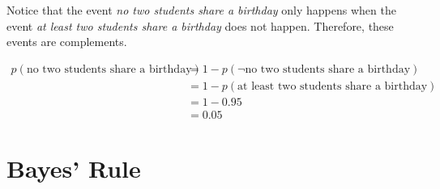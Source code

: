\documentclass[assignment01_Solutions]{subfiles}
\begin{document}
\begin{exercise}[(10 minutes)]
\begin{boxedsolution}
Notice that the event \emph{no two students share a birthday} only happens when the event \emph{at least two students share a birthday} does not happen.  Therefore, these events are complements.

\begin{align}
p(\mbox{no two students share a birthday}) &= 1 - p( \neg \mbox{no two students share a birthday})  \nonumber\\
&= 1 - p(\mbox{at least two students share a birthday}) \nonumber \\
&= 1 - 0.95  \nonumber\\
&= 0.05  \nonumber
\end{align}
\end{boxedsolution}

\ees
\end{exercise}

\section{Bayes' Rule}
\end{document}
